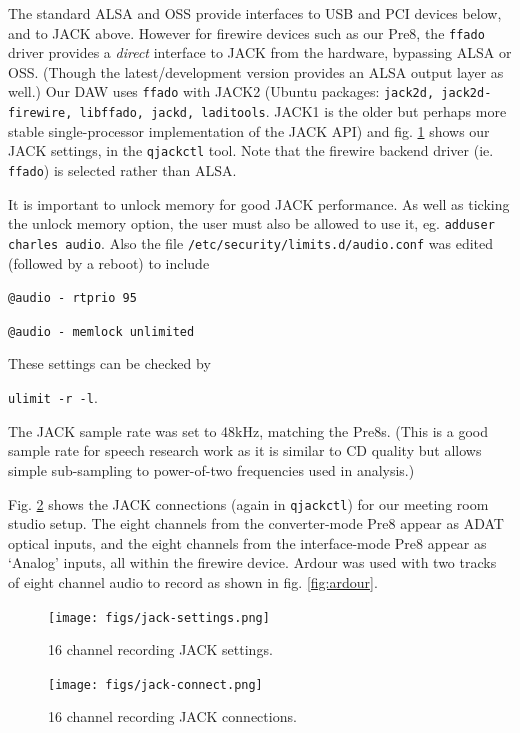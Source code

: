 \documentclass[oneside,english]{scrbook}
\begin{document}
The standard ALSA and OSS provide interfaces to USB and PCI devices below, and to JACK above.  However for firewire devices such as our Pre8, the {\tt ffado} driver  provides a {\em direct} interface to JACK from the hardware, bypassing ALSA or OSS.  (Though the latest/development version provides an ALSA output layer as well.)   Our DAW uses {\tt ffado} with JACK2 (Ubuntu packages: {\tt jack2d, jack2d-firewire, libffado, jackd, laditools}.  JACK1 is the older but perhaps more stable single-processor implementation of the JACK API) and fig. \ref{fig:jack-settings} shows our JACK settings, in the {\tt qjackctl} tool.  Note that the firewire backend driver (ie. {\tt ffado}) is selected rather than ALSA.

It is important to unlock memory for good JACK performance.  As well as ticking the unlock memory option, the user must also be allowed to use it, eg. {\tt adduser charles audio}.  Also the file {\tt /etc/security/limits.d/audio.conf} was edited (followed by a reboot) to include

{\tt @audio - rtprio 95 }

{\tt @audio - memlock unlimited }

These settings can be checked by

{\tt ulimit -r -l}.

The JACK sample rate was set to 48kHz, matching the Pre8s.  (This is a good sample rate for speech research work as it is similar to CD quality but allows simple sub-sampling to power-of-two frequencies used in analysis.)

Fig. \ref{fig:jack-connect} shows the JACK connections (again in {\tt qjackctl}) for our meeting room studio setup.  The eight channels from the converter-mode Pre8 appear as ADAT optical inputs, and the eight channels from the interface-mode Pre8 appear as `Analog' inputs, all within the firewire device.  Ardour was used with two tracks of eight channel audio to record as shown in fig. \ref{fig:ardour}.



\begin{figure}
  \centering
  \texttt{[image: figs/jack-settings.png]}
  \caption{16 channel recording JACK settings.}
  \label{fig:jack-settings}
\end{figure}

\begin{figure}
  \centering
  \texttt{[image: figs/jack-connect.png]}
  \caption{16 channel recording JACK connections.}
  \label{fig:jack-connect}
\end{figure}
\end{document}
